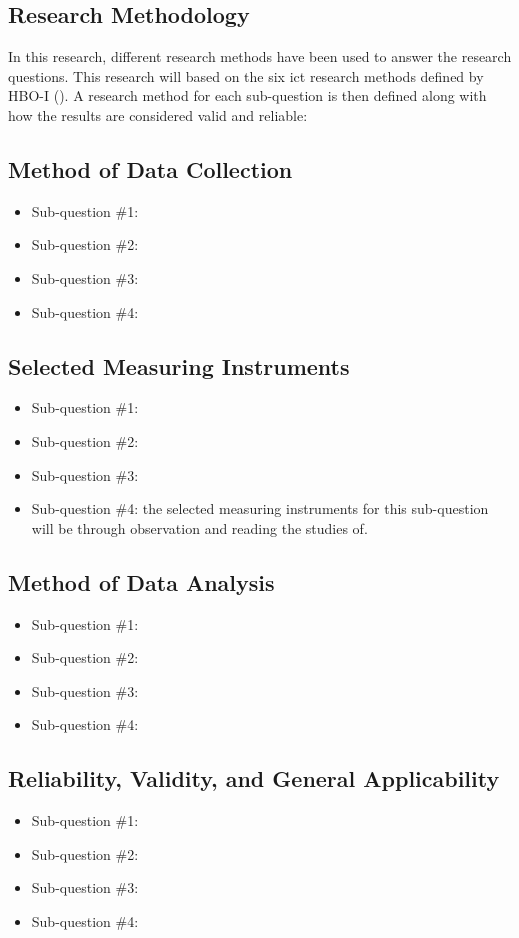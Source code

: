 \begin{multicols}{2}
    \section{Research Methodology}
    In this research, different research methods have been used to answer the research questions. This research will
    based on the six \acrshort{ict} research methods defined by HBO-I (\cite{ictresearchmethods}). A research method for
    each sub-question is then defined along with how the results are considered valid and reliable:
    \subsection{Method of Data Collection}
    \begin{itemize}[label=-]
        \item Sub-question \#1:
        \item Sub-question \#2:
        \item Sub-question \#3:
        \item Sub-question \#4:
    \end{itemize}
    \subsection{Selected Measuring Instruments}
    \begin{itemize}[label=-]
        \item Sub-question \#1:
        \item Sub-question \#2:
        \item Sub-question \#3:
        \item Sub-question \#4: the selected measuring instruments for this sub-question will be through observation
              and reading the studies of.
    \end{itemize}
    \subsection{Method of Data Analysis}
    \begin{itemize}[label=-]
        \item Sub-question \#1:
        \item Sub-question \#2:
        \item Sub-question \#3:
        \item Sub-question \#4:
    \end{itemize}
    \subsection{Reliability, Validity, and General Applicability}
    \begin{itemize}[label=-]
        \item Sub-question \#1:
        \item Sub-question \#2:
        \item Sub-question \#3:
        \item Sub-question \#4:
    \end{itemize}

\end{multicols}
